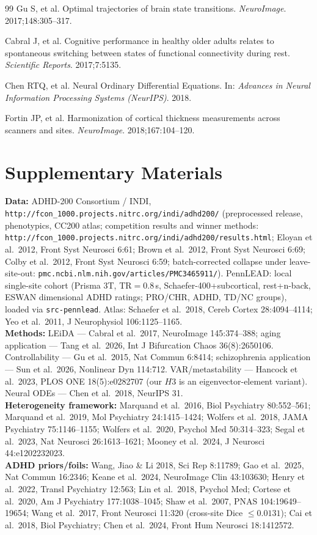 \documentclass{article}
\begin{document}
\begin{thebibliography}{99}
Gu S, et al.
Optimal trajectories of brain state transitions.
\textit{NeuroImage}. 2017;148:305--317.

Cabral J, et al.
Cognitive performance in healthy older adults relates to spontaneous switching
between states of functional connectivity during rest.
\textit{Scientific Reports}. 2017;7:5135.

Chen RTQ, et al.
Neural Ordinary Differential Equations.
In: \textit{Advances in Neural Information Processing Systems (NeurIPS)}.
2018.

Fortin JP, et al.
Harmonization of cortical thickness measurements across scanners and sites.
\textit{NeuroImage}. 2018;167:104--120.

\end{thebibliography}

\section{Supplementary Materials}
\textbf{Data:} ADHD-200 Consortium / INDI, \texttt{http://fcon\_1000.projects.nitrc.org/indi/adhd200/} (preprocessed release, phenotypics, CC200 atlas; competition results and winner methods: \texttt{http://fcon\_1000.projects.nitrc.org/indi/adhd200/results.html}; Eloyan et al.\ 2012, Front Syst Neurosci 6:61; Brown et al.\ 2012, Front Syst Neurosci 6:69; Colby et al.\ 2012, Front Syst Neurosci 6:59; batch-corrected collapse under leave-site-out: \texttt{pmc.ncbi.nlm.nih.gov/articles/PMC3465911/}). PennLEAD: local single-site cohort (Prisma 3T, TR$=$0.8\,s, Schaefer-400+subcortical, rest+n-back, ESWAN dimensional ADHD ratings; PRO/CHR, ADHD, TD/NC groups), loaded via \texttt{src-pennlead}. Atlas: Schaefer et al.\ 2018, Cereb Cortex 28:4094--4114; Yeo et al.\ 2011, J Neurophysiol 106:1125--1165. \\
\textbf{Methods:} LEiDA --- Cabral et al.\ 2017, NeuroImage 145:374--388; aging application --- Tang et al.\ 2026, Int J Bifurcation Chaos 36(8):2650106. Controllability --- Gu et al.\ 2015, Nat Commun 6:8414; schizophrenia application --- Sun et al.\ 2026, Nonlinear Dyn 114:712. VAR/metastability --- Hancock et al.\ 2023, PLOS ONE 18(5):e0282707 (our $H3$ is an eigenvector-element variant). Neural ODEs --- Chen et al.\ 2018, NeurIPS 31. \\
\textbf{Heterogeneity framework:} Marquand et al.\ 2016, Biol Psychiatry 80:552--561; Marquand et al.\ 2019, Mol Psychiatry 24:1415--1424; Wolfers et al.\ 2018, JAMA Psychiatry 75:1146--1155; Wolfers et al.\ 2020, Psychol Med 50:314--323; Segal et al.\ 2023, Nat Neurosci 26:1613--1621; Mooney et al.\ 2024, J Neurosci 44:e1202232023. \\
\textbf{ADHD priors/foils:} Wang, Jiao \& Li 2018, Sci Rep 8:11789; Gao et al.\ 2025, Nat Commun 16:2346; Keane et al.\ 2024, NeuroImage Clin 43:103630; Henry et al.\ 2022, Transl Psychiatry 12:563; Lin et al.\ 2018, Psychol Med; Cortese et al.\ 2020, Am J Psychiatry 177:1038--1045; Shaw et al.\ 2007, PNAS 104:19649--19654; Wang et al.\ 2017, Front Neurosci 11:320 (cross-site Dice $\le 0.0131$); Cai et al.\ 2018, Biol Psychiatry; Chen et al.\ 2024, Front Hum Neurosci 18:1412572.
\end{document}
